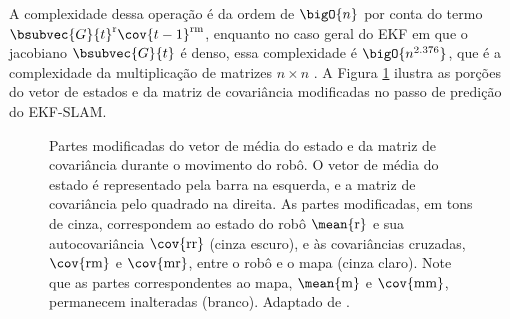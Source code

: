 \renewcommand{\arraystretch}{1.0}
A complexidade dessa operação é da ordem de $\bigO{n}$ por conta do termo $\bsubvec{G}{t}^\mathrm{r} \cov{t-1}^\mathrm{rm}$, enquanto no caso geral do EKF em que o jacobiano $\bsubvec{G}{t}$ é denso, essa complexidade é $\bigO{n^{2.376}}$, que é a complexidade da multiplicação de matrizes $n \times n$ \cite{coppersmith1987matrix}. A Figura 
\ref{fig:ekfslam-prediction} ilustra as porções do vetor de estados e da 
matriz de covariância modificadas no passo de predição do EKF-SLAM.

\begin{figure}[h]
  \centering
  
  \caption{Partes modificadas do vetor de média do estado e da matriz de covariância durante o movimento do robô. O vetor de média do estado é representado pela barra na esquerda, e a matriz de covariância pelo quadrado na direita. As partes modificadas, em tons de cinza, correspondem ao estado do robô $\mean{\mathrm{r}}$  e sua autocovariância $\cov{\mathrm{rr}}$ (cinza escuro), e às covariâncias cruzadas, $\cov{\mathrm{rm}}$ e $\cov{\mathrm{mr}}$, entre o robô e o mapa (cinza claro). Note que as partes correspondentes ao mapa, $\mean{\mathrm{m}}$ e $\cov{\mathrm{mm}}$, 
  permanecem inalteradas (branco). Adaptado de .}
  \label{fig:ekfslam-prediction}
\end{figure}



